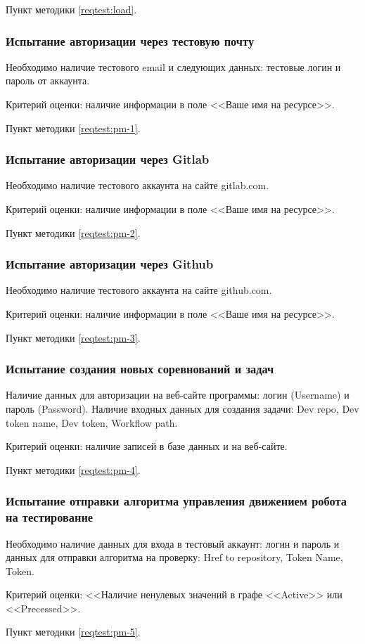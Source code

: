 Пункт методики \ref{reqtest:load}.


\subsubsection{Испытание авторизации через тестовую почту} \label{req:check-self-email}
Необходимо наличие тестового email и следующих данных: тестовые логин и пароль от аккаунта.

Критерий оценки: наличие информации в поле <<Ваше имя на ресурсе>>. 

Пункт методики \ref{reqtest:pm-1}.

\subsubsection{Испытание авторизации через Gitlab} \label{req:check-gitlab-email}
Необходимо наличие тестового аккаунта на сайте gitlab.com.

Критерий оценки: наличие информации в поле <<Ваше имя на ресурсе>>. 

Пункт методики \ref{reqtest:pm-2}.

\subsubsection{Испытание авторизации через Github} \label{req:check-github-email}
Необходимо наличие тестового аккаунта на сайте github.com.

Критерий оценки: наличие информации в поле <<Ваше имя на ресурсе>>. 

Пункт методики \ref{reqtest:pm-3}.

\subsubsection{Испытание создания новых соревнований и задач} \label{req:check-competitions}
Наличие данных для авторизации на веб-сайте программы: логин (Username) и пароль (Password). Наличие входных данных для создания задачи: Dev repo, Dev token name, Dev token, Workflow path.

Критерий оценки: наличие записей в базе данных и на веб-сайте. 

Пункт методики \ref{reqtest:pm-4}.

\subsubsection{Испытание отправки алгоритма управления движением робота на тестирование} \label{req:check-sol-submit}
Необходимо наличие данных для входа в тестовый аккаунт: логин и пароль и данных для отправки алгоритма на проверку: Href to repository, Token Name, Token.

Критерий оценки: <<Наличие ненулевых значений в графе <<Active>> или <<Precessed>>. 

Пункт методики \ref{reqtest:pm-5}.
